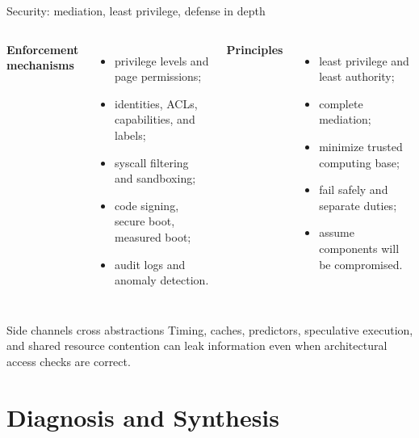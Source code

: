 \documentclass[aspectratio=169,11pt]{beamer}
\begin{document}
\begin{frame}{Security: mediation, least privilege, defense in depth}
  \begin{columns}[T,onlytextwidth]
      \textbf{Enforcement mechanisms}
      \begin{itemize}
        \item privilege levels and page permissions;
        \item identities, ACLs, capabilities, and labels;
        \item syscall filtering and sandboxing;
        \item code signing, secure boot, measured boot;
        \item audit logs and anomaly detection.
      \end{itemize}
      \textbf{Principles}
      \begin{itemize}
        \item least privilege and least authority;
        \item complete mediation;
        \item minimize trusted computing base;
        \item fail safely and separate duties;
        \item assume components will be compromised.
      \end{itemize}
  \end{columns}
  \begin{alertblock}{Side channels cross abstractions}
    Timing, caches, predictors, speculative execution, and shared resource contention can leak information even when architectural access checks are correct.
  \end{alertblock}
\end{frame}

\section{Diagnosis and Synthesis}
\end{document}
